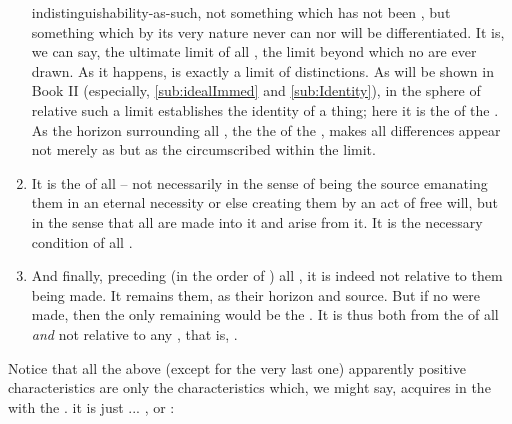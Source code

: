 \begin{enumerate}
  indistinguishability-as-such, not something which has not been
   , but something which by its very nature never
  can nor will be differentiated. It is, we can say, the ultimate limit of all
  , the limit beyond which no  are ever drawn.
  As it happens,  is exactly a limit of distinctions. As will be shown
  in Book II (especially, \ref{sub:idealImmed} and \ref{sub:Identity}), in the
  sphere of relative  such a limit establishes the identity of a
  thing; here it is the  of the . As the horizon
  surrounding all , the   the  of
  the , makes all differences appear not merely as 
  but as the  circumscribed within the limit.
\item It is the  of all  -- not necessarily in the
  sense of being the source emanating them in an eternal necessity or else
  creating them by an act of free will, but in the sense that all
   are made into it and arise from it. It is the necessary
  condition of all . 
\item\label{pnt:primacyOne} And finally, preceding (in the order of ) all
  , it is indeed not relative to them being made. It remains
   them, as their horizon and source. But if no  were
  made, then the only remaining would be the . It is
  thus both  from the  of all 
  {\em and} not relative to any , that is, .
\end{enumerate}
Notice that all the above (except for the very last one) apparently positive
characteristics are only the characteristics which, we might say,
 acquires in the  with the .
 it is just ... , or : 

